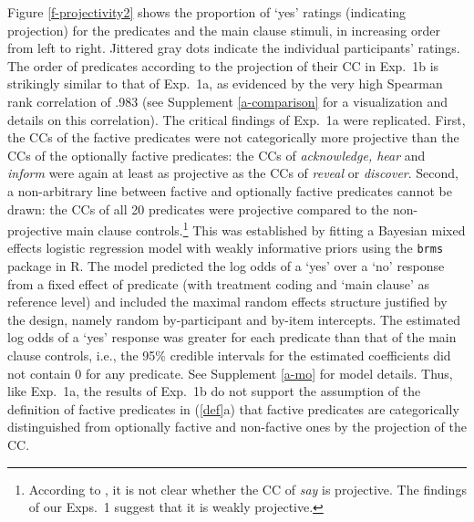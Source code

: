 \documentclass[11pt,fleqn]{article}
\newcommand{\6}{\mbox{$[\hspace*{-.6mm}[$}}
\newcommand{\9}{\mbox{$]\hspace*{-.6mm}]$}}
\begin{document}
Figure \ref{f-projectivity2} shows the proportion of `yes' ratings (indicating projection) for the predicates and the main clause stimuli, in increasing order from left to right. Jittered gray dots indicate the individual participants' ratings. The order of predicates according to the projection of their CC in Exp.~1b is strikingly similar to that of Exp.~1a, as evidenced by the very high Spearman rank correlation of .983 (see Supplement \ref{a-comparison} for a visualization and details on this correlation). The critical findings of Exp.~1a were replicated. First, the CCs of the factive predicates were not categorically more projective than the CCs of the optionally factive predicates:  the CCs of {\em acknowledge, hear} and {\em inform} were again at least as projective as the CCs of {\em reveal} or {\em discover}. Second, a non-arbitrary line between factive and optionally factive predicates cannot be drawn: the CCs of all 20 predicates were projective compared to the non-projective main clause controls.\footnote{According to \citet[1739]{spector-egre2015}, it is not clear whether the CC of {\em say} is projective. The findings of our Exps.~1 suggest that it is weakly projective.}  This was established by fitting a Bayesian mixed effects logistic regression model  with weakly informative priors using the \verb|brms| package in R. The model predicted the log odds of a `yes' over a `no' response from a fixed effect of predicate (with treatment coding and `main clause' as  reference level) and included the maximal random effects structure justified by the design, namely random by-participant and by-item intercepts. The estimated log odds of a `yes' response was greater for each predicate than that of the main clause controls, i.e., the 95\% credible intervals for the estimated coefficients did not contain 0 for any predicate. See Supplement \ref{a-mo} for model details. Thus, like Exp.~1a, the results of Exp.~1b do not support the assumption of the definition of factive predicates in (\ref{def}a) that factive predicates are categorically distinguished from optionally factive and non-factive ones by the projection of the CC.
\end{document}
